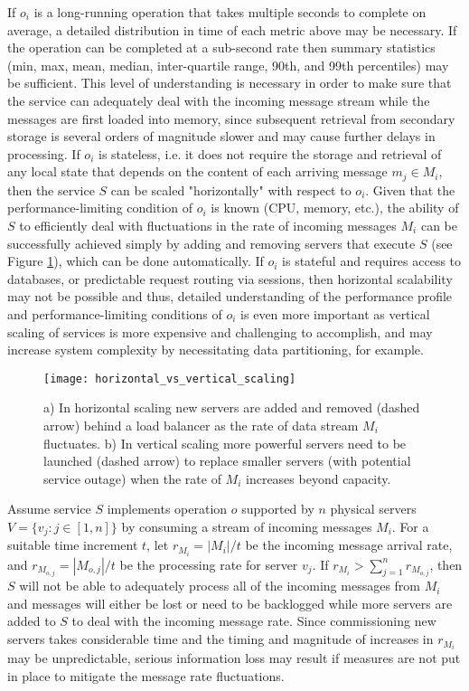 If $o_i$ is a long-running operation that takes multiple seconds to complete on average, a detailed distribution in time of each metric above may be necessary. If the operation can be completed at a sub-second rate then summary statistics (min, max, mean, median, inter-quartile range, 90th, and 99th percentiles) may be sufficient. This level of understanding is necessary in order to make sure that the service can adequately deal with the incoming message stream while the messages are first loaded into memory, since subsequent retrieval from secondary storage is several orders of magnitude slower and may cause further delays in processing. If $o_i$ is stateless, i.e. it does not require the storage and retrieval of any local state that depends on the content of each arriving message $m_j \in M_i$, then the service $S$ can be scaled "horizontally"\autocite{vaquero2011dynamically} with respect to $o_i$. Given that the performance-limiting condition of $o_i$ is known (CPU, memory, etc.), the ability of $S$ to efficiently deal with fluctuations in the rate of incoming messages $M_i$ can be successfully achieved simply by adding and removing servers that execute $S$ (see Figure \ref{fig:horizontal_vs_vertical_scaling}), which can be done automatically\autocite{mao2011auto}. If $o_i$ is stateful and requires access to databases, or predictable request routing via sessions, then horizontal scalability may not be possible and thus, detailed understanding of the performance profile and performance-limiting conditions of $o_i$ is even more important as vertical scaling of services is more expensive and challenging to accomplish, and may increase system complexity by necessitating data partitioning, for example\autocite{vaquero2011dynamically}.

\begin{figure}[H]
\texttt{[image: horizontal\_vs\_vertical\_scaling]}
\centering
\caption {a) In horizontal scaling new servers are added and removed (dashed arrow) behind a load balancer as the rate of data stream $M_i$ fluctuates. b) In vertical scaling more powerful servers need to be launched (dashed arrow) to replace smaller servers (with potential service outage) when the rate of $M_i$ increases beyond capacity.}
\label{fig:horizontal_vs_vertical_scaling}
\end{figure}

Assume service $S$ implements operation $o$ supported by $n$ physical servers $V = \{v_j: j \in [1,n]\}$ by consuming a stream of incoming messages $M_i$. For a suitable time increment $t$, let $r_{M_i} = |M_i|/t$ be the incoming message arrival rate, and $r_{M_{o,j}} = |M_{o,j}|/t$ be the processing rate for server $v_j$. If $r_{M_i} > \sum_{j=1}^n r_{M_{o,j}}$, then $S$ will not be able to adequately process all of the incoming messages from $M_i$ and messages will either be lost or need to be backlogged while more servers are added to $S$ to deal with the incoming message rate. Since commissioning new servers takes considerable time and the timing and magnitude of increases in $r_{M_i}$ may be unpredictable, serious information loss may result if measures are not put in place to mitigate the message rate fluctuations. 


